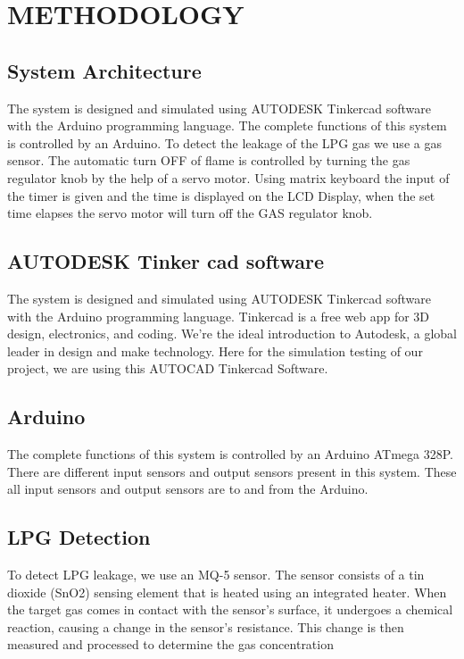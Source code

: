 \documentclass[a4paper,12pt]{report}
\begin{document}
\chapter{METHODOLOGY}

\section{System Architecture}
The system is designed and simulated using AUTODESK Tinkercad software with the Arduino
programming language. The complete functions of this system is controlled by an Arduino. To
detect the leakage of the LPG gas we use a gas sensor. The automatic turn OFF of flame is
controlled by turning the gas regulator knob by the help of a servo motor. Using matrix keyboard
the input of the timer is given and the time is displayed on the LCD Display, when the set time
elapses the servo motor will turn off the GAS regulator knob.

\section{AUTODESK Tinker cad software}
The system is designed and simulated using AUTODESK Tinkercad software with the Arduino
programming language. Tinkercad is a free web app for 3D design, electronics, and coding. We’re
the ideal introduction to Autodesk, a global leader in design and make technology. Here for the
simulation testing of our project, we are using this AUTOCAD Tinkercad Software.

\section{Arduino}
The complete functions of this system is controlled by an Arduino ATmega 328P. There are
different input sensors and output sensors present in this system. These all input sensors and output
sensors are to and from the Arduino.

\section{LPG Detection}
To detect LPG leakage, we use an MQ-5 sensor. The sensor consists of a tin dioxide (SnO2)
sensing element that is heated using an integrated heater. When the target gas comes in contact
with the sensor's surface, it undergoes a chemical reaction, causing a change in the sensor's
resistance. This change is then measured and processed to determine the gas concentration
\end{document}
